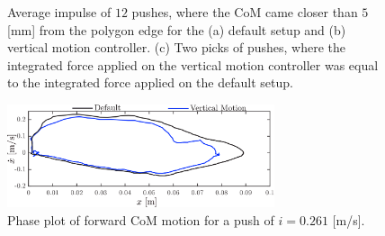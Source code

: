 \begin{figure}
\begin{subfigure}{0.32\textwidth}
  \caption{}
   \label{fig:imp3}
  \end{subfigure}
  \caption{Average impulse of $12$ pushes, where the \ac{CoM} came closer than $5$ [mm] from the polygon edge for the (a) default setup and (b) vertical motion controller. (c) Two picks of pushes, where the integrated force applied on the vertical motion controller was equal to the integrated force applied on the default setup. }
  \label{fig:impulsecompare}
\end{figure}

\begin{figure}
\centering
\includegraphics[width=0.7\textwidth]{STYLESTUFF/valcomparephaseHW.png}
\caption{Phase plot of forward \ac{CoM} motion for a push of $i=0.261$ [m/s].}
\label{fig:valcomparephaseHW}
\end{figure}
